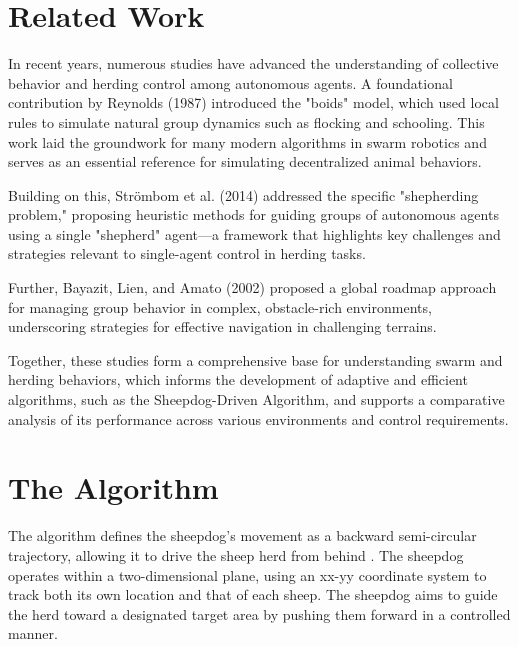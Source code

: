 \documentclass[9pt]{pnas-new}
\begin{document}

\section*{Related Work}

In recent years, numerous studies have advanced the understanding of collective behavior and herding control among autonomous agents. A foundational contribution by Reynolds (1987) \cite{reynols1987} introduced the "boids" model, which used local rules to simulate natural group dynamics such as flocking and schooling. This work laid the groundwork for many modern algorithms in swarm robotics and serves as an essential reference for simulating decentralized animal behaviors. 

Building on this, Strömbom et al. (2014) \cite{Strmbom2014SolvingTS} addressed the specific "shepherding problem," proposing heuristic methods for guiding groups of autonomous agents using a single "shepherd" agent—a framework that highlights key challenges and strategies relevant to single-agent control in herding tasks. 

Further, Bayazit, Lien, and Amato (2002) \cite{bayazit2002} proposed a global roadmap approach for managing group behavior in complex, obstacle-rich environments, underscoring strategies for effective navigation in challenging terrains. 

Together, these studies form a comprehensive base for understanding swarm and herding behaviors, which informs the development of adaptive and efficient algorithms, such as the Sheepdog-Driven Algorithm, and supports a comparative analysis of its performance across various environments and control requirements.

\section*{The Algorithm}
The algorithm defines the sheepdog’s movement as a backward semi-circular trajectory, allowing it to drive the sheep herd from behind \cite{liu2021}. The sheepdog operates within a two-dimensional plane, using an xx-yy coordinate system to track both its own location and that of each sheep. The sheepdog aims to guide the herd toward a designated target area by pushing them forward in a controlled manner.
\end{document}
